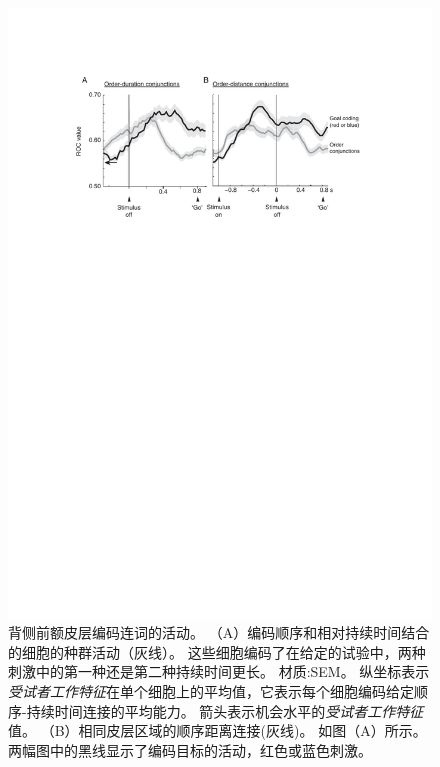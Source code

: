 \begin{figure}
	\centering
	\includegraphics[width=0.65\linewidth]{chap6/6_14}
	\caption{背侧前额皮层编码连词的活动。
		（A）编码顺序和相对持续时间结合的细胞的种群活动（灰线）。
		这些细胞编码了在给定的试验中，两种刺激中的第一种还是第二种持续时间更长。
		材质:SEM。
		纵坐标表示\textit{受试者工作特征}在单个细胞上的平均值，它表示每个细胞编码给定顺序-持续时间连接的平均能力。
		箭头表示机会水平的\textit{受试者工作特征}值。
		（B）相同皮层区域的顺序距离连接(灰线)。
		如图（A）所示。
		两幅图中的黑线显示了编码目标的活动，红色或蓝色刺激\cite{genovesio2011prefrontal}。}
	\label{fig:6_14}
\end{figure}



